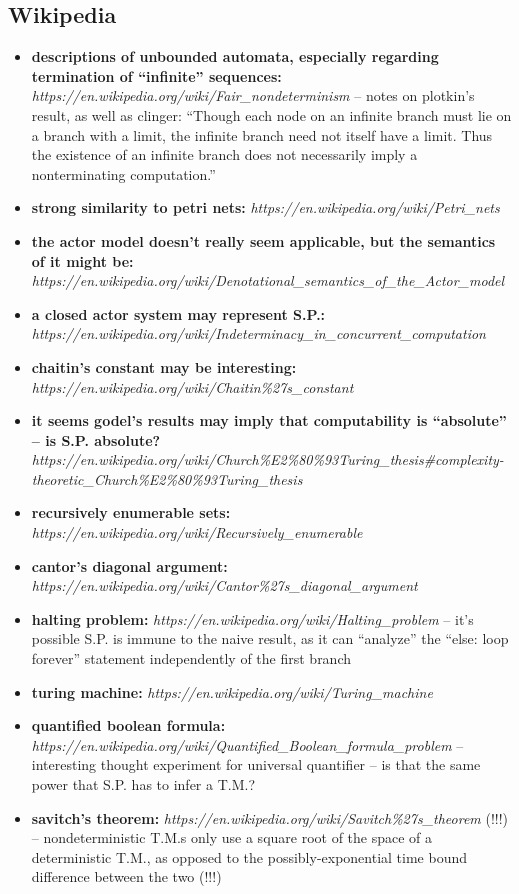 \documentclass{article}
\begin{document}
\subsection{Wikipedia}
\begin{itemize}
  \item \textbf{descriptions of unbounded automata, especially regarding termination of ``infinite'' sequences:} \textit{https://en.wikipedia.org/wiki/Fair\_nondeterminism} -- notes on plotkin's result, as well as clinger: ``Though each node on an infinite branch must lie on a branch with a limit, the infinite branch need not itself have a limit. Thus the existence of an infinite branch does not necessarily imply a nonterminating computation.''
  \item \textbf{strong similarity to petri nets:} \textit{https://en.wikipedia.org/wiki/Petri\_nets}
  \item \textbf{the actor model doesn't really seem applicable, but the semantics of it might be:} \textit{https://en.wikipedia.org/wiki/Denotational\_semantics\_of\_the\_Actor\_model}
  \item \textbf{a closed actor system may represent S.P.:} \textit{https://en.wikipedia.org/wiki/Indeterminacy\_in\_concurrent\_computation}
  \item \textbf{chaitin's constant may be interesting:} \textit{https://en.wikipedia.org/wiki/Chaitin\%27s\_constant}
  \item \textbf{it seems godel's results may imply that computability is ``absolute'' -- is S.P. absolute?} \textit{https://en.wikipedia.org/wiki/Church\%E2\%80\%93Turing\_thesis\#complexity-theoretic\_Church\%E2\%80\%93Turing\_thesis}
  \item \textbf{recursively enumerable sets:} \textit{https://en.wikipedia.org/wiki/Recursively\_enumerable}
  \item \textbf{cantor's diagonal argument:} \textit{https://en.wikipedia.org/wiki/Cantor\%27s\_diagonal\_argument}
  \item \textbf{halting problem:} \textit{https://en.wikipedia.org/wiki/Halting\_problem} -- it's possible S.P. is immune to the naive result, as it can ``analyze'' the ``else: loop forever'' statement independently of the first branch
  \item \textbf{turing machine:} \textit{https://en.wikipedia.org/wiki/Turing\_machine}
  \item \textbf{quantified boolean formula:} \textit{https://en.wikipedia.org/wiki/Quantified\_Boolean\_formula\_problem} -- interesting thought experiment for universal quantifier -- is that the same power that S.P. has to infer a T.M.?
  \item \textbf{savitch's theorem:} \textit{https://en.wikipedia.org/wiki/Savitch\%27s\_theorem} (!!!) -- nondeterministic T.M.s only use a square root of the space of a deterministic T.M., as opposed to the possibly-exponential time bound difference between the two (!!!)
\end{itemize}
\end{document}
